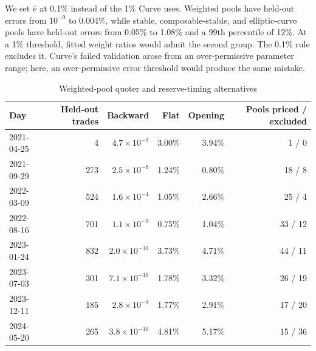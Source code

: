 We set $\bar e$ at 0.1\% instead of the 1\% Curve uses. Weighted pools have held-out errors from $10^{-9}$ to 0.004\%, while stable, composable-stable, and elliptic-curve pools have held-out errors from 0.05\% to 1.08\% and a 99th percentile of 12\%. At a 1\% threshold, fitted weight ratios would admit the second group. The 0.1\% rule excludes it. Curve's failed validation arose from an over-permissive parameter range; here, an over-permissive error threshold would produce the same mistake.

\begin{table}[t]
\centering
\caption{Weighted-pool quoter and reserve-timing alternatives}
\label{tab:app:weighted}
\begin{tabular}{lrrrrr}
\toprule
Day & Held-out trades & Backward & Flat & Opening & Pools priced / excluded \\
\midrule
2021-04-25 & 4 & $4.7\times10^{-9}$ & 3.00\% & 3.94\% & 1 / 0 \\
2021-09-29 & 273 & $2.5\times10^{-8}$ & 1.24\% & 0.80\% & 18 / 8 \\
2022-03-09 & 524 & $1.6\times10^{-4}$ & 1.05\% & 2.66\% & 25 / 4 \\
2022-08-16 & 701 & $1.1\times10^{-9}$ & 0.75\% & 1.04\% & 33 / 12 \\
2023-01-24 & 832 & $2.0\times10^{-10}$ & 3.73\% & 4.71\% & 44 / 11 \\
2023-07-03 & 301 & $7.1\times10^{-10}$ & 1.78\% & 3.32\% & 26 / 19 \\
2023-12-11 & 185 & $2.8\times10^{-9}$ & 1.77\% & 2.91\% & 17 / 20 \\
2024-05-20 & 265 & $3.8\times10^{-10}$ & 4.81\% & 5.17\% & 15 / 36 \\

\end{tabular}
\end{table}
